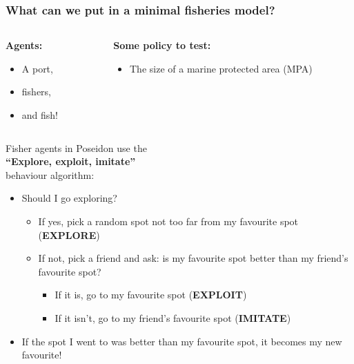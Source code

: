 \documentclass[table, 14pt, aspectratio=169]{beamer}
\newcommand{\hl}[1]{\textcolor{OxfordBlue}{\textbf{#1}}}
\begin{document}
\begin{frame}[t]\frametitle{What can we put in a minimal fisheries model?}
  \Large
  \vfill
  \begin{columns}[T]
    \begin{column}{0.4\textwidth}
      \hl{Agents:}
      \begin{itemize}
        \item A port,
        \item fishers,
        \item and fish!
      \end{itemize}
    \end{column}
    \begin{column}{0.6\textwidth}
      \hl{Some policy to test:}
      \begin{itemize}
        \item The size of a marine protected area (MPA)
      \end{itemize}
    \end{column}
  \end{columns}
  \vfill
\end{frame}

\begin{frame}[t]
  \Large Fisher agents in Poseidon use the\\\hl{``Explore, exploit, imitate''}\\behaviour algorithm:
  \vfill
  \begin{tcolorbox}[halign=flush left]
  \begin{itemize}\small
    \item Should I go exploring?
    \begin{itemize}\small
      \item If yes, pick a random spot not too far from my favourite spot (\hl{EXPLORE})
      \item If not, pick a friend and ask: is my favourite spot better than my friend's favourite spot?
      \begin{itemize}\small
        \item If it is, go to my favourite spot (\hl{EXPLOIT})
        \item If it isn't, go to my friend's favourite spot (\hl{IMITATE})
      \end{itemize}
    \end{itemize}
    \item If the spot I went to was better than my favourite spot, it becomes my new favourite!
  \end{itemize}
  \end{tcolorbox}
\end{frame}
\end{document}
